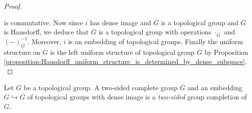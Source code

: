 \documentclass[10pt]{amsart}
\begin{document}
\begin{proof}
\begin{center}
	\end{center}
	is commutative. Now since $i$ has dense image and $G$ is a topological group and $\overline{G}$ is Hausdorff, we deduce that $\overline{G}$ is a topological group with operations $\cdot_{\overline{G}}$ and $(-)^{-1}_{\overline{G}}$. Moreover, $i$ is an embedding of topological groups. Finally the uniform structure on $\overline{G}$ is the left uniform structure of topological group $\overline{G}$ by Proposition \ref{proposition:Hausdorff_uniform_structure_is_determined_by_dense_subspace}.
\end{proof}


\begin{definition}
	Let $G$ be a topological group. A two-sided complete group $\overline{G}$ and an embedding $G \hookrightarrow \overline{G}$ of topological groups with dense image is a \textit{two-sided} group completion of $G$.
\end{definition}
\end{document}
